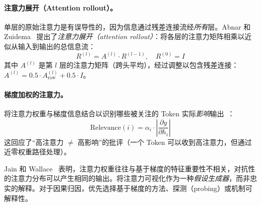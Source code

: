 \paragraph{注意力展开（Attention rollout）。}
\label{attention-rollout.}

单层的原始注意力是有误导性的，因为信息通过残差连接流经\emph{所有}层。Abnar 和 Zuidema~\cite{abnar2020quantifying} 提出了\emph{注意力展开（attention rollout）}：将各层的注意力矩阵相乘以近似从输入到输出的总信息流：
\[
R^{(l)} = A^{(l)} \cdot R^{(l-1)}, \quad R^{(0)} = I
\]
其中 $A^{(l)}$ 是第 $l$ 层的注意力矩阵（跨头平均），经过调整以包含残差连接：$A^{(l)} = 0.5 \cdot A^{(l)}_{\text{raw}} + 0.5 \cdot I$。

\paragraph{梯度加权的注意力。}
\label{gradient-weighted-attention.}

将注意力权重与梯度信息结合以识别哪些被关注的 Token 实际\emph{影响}输出~\cite{barkan2021grad}：
\[
\text{Relevance}(i) = \alpha_i \cdot \left|\frac{\partial y}{\partial h_i}\right|
\]
这回应了``高注意力 $\neq$ 高影响''的批评（一个 Token 可以收到高注意力，但通过近零权重路径处理）。

\begin{warningbox}[注意力不是解释]
Jain 和 Wallace~\cite{jain2019attention} 表明，注意力权重往往与基于梯度的特征重要性不相关，对抗性的注意力分布可以产生相同的输出。将注意力可视化作为一种\emph{假设生成器}，而非忠实的解释。对于因果归因，优先选择基于梯度的方法、探测（probing）或机制可解释性。
\end{warningbox}

